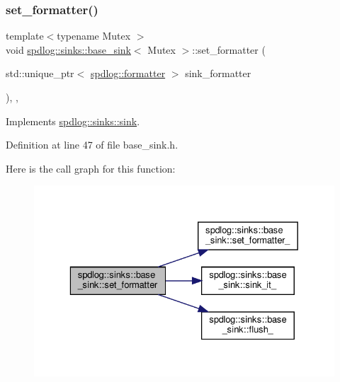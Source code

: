 \subsubsection{\texorpdfstring{set\+\_\+formatter()}{set\_formatter()}}
{\footnotesize\ttfamily template$<$typename Mutex $>$ \\
void \hyperlink{classspdlog_1_1sinks_1_1base__sink}{spdlog\+::sinks\+::base\+\_\+sink}$<$ Mutex $>$\+::set\+\_\+formatter (\begin{DoxyParamCaption}\item[{std\+::unique\+\_\+ptr$<$ \hyperlink{classspdlog_1_1formatter}{spdlog\+::formatter} $>$}]{sink\+\_\+formatter }\end{DoxyParamCaption})\hspace{0.3cm}{\ttfamily [inline]}, {\ttfamily [final]}, {\ttfamily [virtual]}}



Implements \hyperlink{classspdlog_1_1sinks_1_1sink_ac410f2229e583a75337a5fdf45d020be}{spdlog\+::sinks\+::sink}.



Definition at line 47 of file base\+\_\+sink.\+h.

Here is the call graph for this function\+:
\nopagebreak
\begin{figure}[H]
\begin{center}
\leavevmode
\includegraphics[width=329pt]{classspdlog_1_1sinks_1_1base__sink_ad66435c2e9e0adb06ee279dde88a2243_cgraph}
\end{center}
\end{figure}
\mbox{\label{classspdlog_1_1sinks_1_1base__sink_aed93aabfba62b684e603eb525671c864}} 

